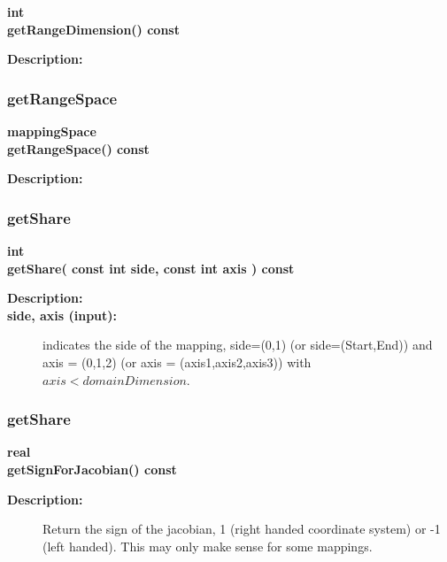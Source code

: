 \begin{flushleft} \textbf{%
int  \\ 
\settowidth{\MappingIncludeArgIndent}{getRangeDimension(}%
getRangeDimension() const 
}\end{flushleft}
\begin{description}
\item[{\bf Description:}] 
\end{description}
\subsubsection{getRangeSpace}
 
\begin{flushleft} \textbf{%
mappingSpace  \\ 
\settowidth{\MappingIncludeArgIndent}{getRangeSpace(}%
getRangeSpace() const 
}\end{flushleft}
\begin{description}
\item[{\bf Description:}] 
\end{description}
\subsubsection{getShare}
 
\begin{flushleft} \textbf{%
int  \\ 
\settowidth{\MappingIncludeArgIndent}{getShare(}%
getShare( const int side, const int axis ) const
}\end{flushleft}
\begin{description}
\item[{\bf Description:}] 
\item[{\bf side, axis (input):}]  indicates the side of the mapping, side=(0,1) (or side=(Start,End)) 
     and axis = (0,1,2) (or axis = (axis1,axis2,axis3)) with $axis<domainDimension$.
\end{description}
\subsubsection{getShare}
 
\begin{flushleft} \textbf{%
real  \\ 
\settowidth{\MappingIncludeArgIndent}{getSignForJacobian(}%
getSignForJacobian() const
}\end{flushleft}
\begin{description}
\item[{\bf Description:}] 
   Return the sign of the jacobian, 1 (right handed coordinate system) or -1 (left handed).
  This may only make sense for some mappings.
\end{description}

